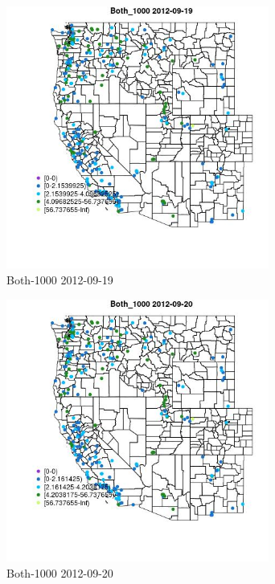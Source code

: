 \begin{figure} 
\centering  
\includegraphics[width=0.77\textwidth]{Code_Outputs/ML_input_report_ML_input_PM25_Step5_part_d_de_duplicated_aves_ML_input_MapObsBoth_10002012-09-19.jpg} 
\caption{\label{fig:ML_input_report_ML_input_PM25_Step5_part_d_de_duplicated_aves_ML_inputMapObsBoth_10002012-09-19}Both-1000 2012-09-19} 
\end{figure} 
 

\begin{figure} 
\centering  
\includegraphics[width=0.77\textwidth]{Code_Outputs/ML_input_report_ML_input_PM25_Step5_part_d_de_duplicated_aves_ML_input_MapObsBoth_10002012-09-20.jpg} 
\caption{\label{fig:ML_input_report_ML_input_PM25_Step5_part_d_de_duplicated_aves_ML_inputMapObsBoth_10002012-09-20}Both-1000 2012-09-20} 
\end{figure} 
 


